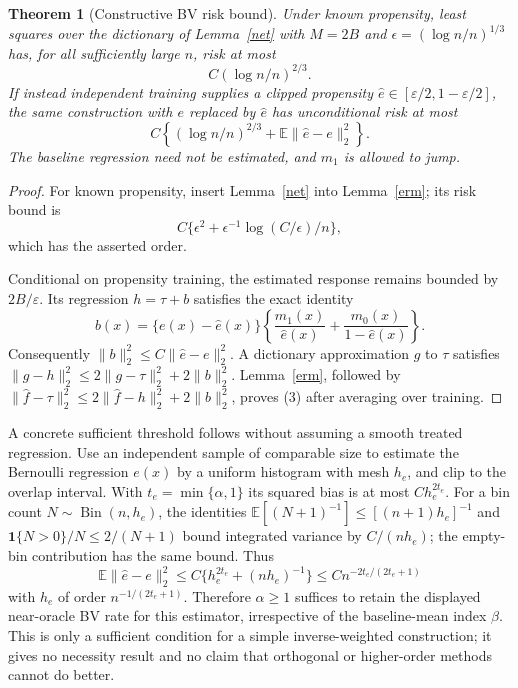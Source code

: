 \documentclass[11pt]{article}
\newtheorem{theorem}{Theorem}
\theoremstyle{remark}
\newcommand{\E}{\mathbb E}
\newcommand{\Ind}{\mathbf 1}
\begin{document}
\begin{theorem}[Constructive BV risk bound]\label{bvupper}
Under known propensity, least squares over the dictionary of Lemma~\ref{net} with $M=2B$ and $\epsilon=(\log n/n)^{1/3}$ has, for all sufficiently large $n$, risk at most
\[
                         C(\log n/n)^{2/3}.
\]
If instead independent training supplies a clipped propensity
$\widehat e\in[\varepsilon/2,1-\varepsilon/2]$, the same construction with $e$ replaced by $\widehat e$ has unconditional risk at most
\[
 C\left\{(\log n/n)^{2/3}
               +\E\|\widehat e-e\|_2^2\right\}.\tag{3}
\]
The baseline regression need not be estimated, and $m_1$ is allowed to jump.
\end{theorem}
\begin{proof}
For known propensity, insert Lemma~\ref{net} into Lemma~\ref{erm}; its risk bound is
\[C\{\epsilon^2+\epsilon^{-1}\log(C/\epsilon)/n\},\]
which has the asserted order.

Conditional on propensity training, the estimated response remains bounded by $2B/\varepsilon$. Its regression $h=\tau+b$ satisfies the exact identity
\[
 b(x)=\{e(x)-\widehat e(x)\}
       \left\{\frac{m_1(x)}{\widehat e(x)}
                         +\frac{m_0(x)}{1-\widehat e(x)}\right\}.
\]
Consequently $\|b\|_2^2\leq C\|\widehat e-e\|_2^2$. A dictionary approximation $g$ to $\tau$ satisfies $\|g-h\|_2^2\leq2\|g-\tau\|_2^2+2\|b\|_2^2$. Lemma~\ref{erm}, followed by
$\|\widehat f-\tau\|_2^2\leq2\|\widehat f-h\|_2^2+2\|b\|_2^2$, proves (3) after averaging over training.
\end{proof}

A concrete sufficient threshold follows without assuming a smooth treated regression. Use an independent sample of comparable size to estimate the Bernoulli regression $e(x)$ by a uniform histogram with mesh $h_e$, and clip to the overlap interval. With $t_e=\min\{\alpha,1\}$ its squared bias is at most $C h_e^{2t_e}$. For a bin count $N\sim\operatorname{Bin}(n,h_e)$, the identities
$\E[(N+1)^{-1}]\leq[(n+1)h_e]^{-1}$ and
$\Ind\{N>0\}/N\leq2/(N+1)$ bound integrated variance by $C/(nh_e)$; the empty-bin contribution has the same bound. Thus
\[
 \E\|\widehat e-e\|_2^2
        \leq C\{h_e^{2t_e}+(nh_e)^{-1}\}
        \leq C n^{-2t_e/(2t_e+1)}
\]
with $h_e$ of order $n^{-1/(2t_e+1)}$. Therefore $\alpha\geq1$ suffices to retain the displayed near-oracle BV rate for this estimator, irrespective of the baseline-mean index $\beta$. This is only a sufficient condition for a simple inverse-weighted construction; it gives no necessity result and no claim that orthogonal or higher-order methods cannot do better.
\end{document}
